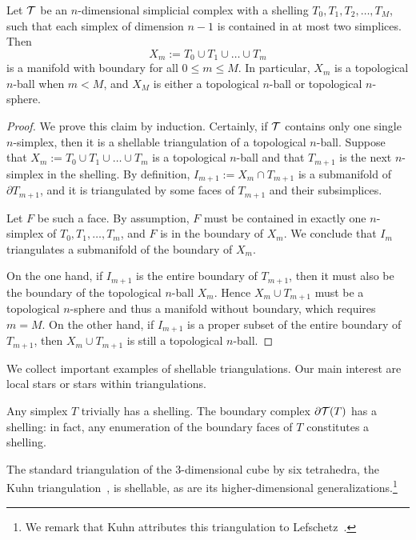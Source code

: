 \documentclass[10pt,letterpaper]{article}
\begin{document}
\begin{lemma}    
    Let ${\mathcal T}$ be an $n$-dimensional simplicial complex 
    with a shelling $T_{0}, T_{1}, T_{2}, \dots, T_{M}$,
    such that each simplex of dimension $n-1$ is contained in at most two simplices. 
    Then
    $$
        X_{m} := T_{0} \cup T_{1} \cup \dots \cup T_{m}
    $$ 
    is a manifold with boundary for all $0 \leq m \leq M$.
    In particular, $X_{m}$ is a topological $n$-ball when $m < M$, 
    and 
    $X_{M}$ is either a topological $n$-ball or topological $n$-sphere. 
\end{lemma}
\begin{proof}  
    We prove this claim by induction. 
    Certainly, if ${\mathcal T}$ contains only one single $n$-simplex, then it is a shellable triangulation of a topological $n$-ball. 
    Suppose that $X_m := T_{0} \cup T_{1} \cup \dots \cup T_{m}$ is a topological $n$-ball and that $T_{m+1}$ is the next $n$-simplex in the shelling.
    By definition, $I_{m+1} := X_{m} \cap T_{m+1}$ is a submanifold of $\partial T_{m+1}$,
    and it is triangulated by some faces of $T_{m+1}$ and their subsimplices. 
    
    Let $F$ be such a face. 
    By assumption, $F$ must be contained in exactly one $n$-simplex of $T_{0}, T_{1}, \dots, T_{m}$,
    and $F$ is in the boundary of $X_{m}$. We conclude that $I_{m}$ triangulates a submanifold of the boundary of $X_{m}$.
    
    On the one hand, 
    if $I_{m+1}$ is the entire boundary of $T_{m+1}$, 
    then it must also be the boundary of the topological $n$-ball $X_{m}$. 
    Hence $X_{m} \cup T_{m+1}$ must be a topological $n$-sphere and thus a manifold without boundary, which requires $m = M$.
    On the other hand, 
    if $I_{m+1}$ is a proper subset of the entire boundary of $T_{m+1}$, 
    then $X_{m} \cup T_{m+1}$ is still a topological $n$-ball.
\end{proof}






We collect important examples of shellable triangulations.
Our main interest are local stars or stars within triangulations. 

\begin{example}
    Any simplex $T$ trivially has a shelling. The boundary complex $\partial {\mathcal T}(T)$ has a shelling:
    in fact, any enumeration of the boundary faces of $T$ constitutes a shelling.
\end{example}
\begin{example}
    The standard triangulation of the $3$-dimensional cube by six tetrahedra, the Kuhn triangulation~\cite{kuhn1960some}, is shellable, as are its higher-dimensional generalizations.\footnote{We remark that Kuhn attributes this triangulation to Lefschetz~\cite{lefschetz2015introduction}.}
\end{example}
\end{document}
